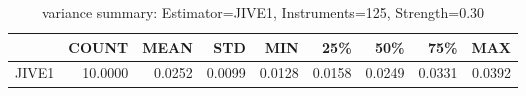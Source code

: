 \begin{table}[ht]
\centering
\caption{variance summary: Estimator=JIVE1, Instruments=125, Strength=0.30}
\begin{tabular}{lrrrrrrrr}
\toprule
 & COUNT & MEAN & STD & MIN & 25\% & 50\% & 75\% & MAX \\
\midrule
JIVE1 & 10.0000 & 0.0252 & 0.0099 & 0.0128 & 0.0158 & 0.0249 & 0.0331 & 0.0392 \\
\bottomrule
\end{tabular}
\end{table}
